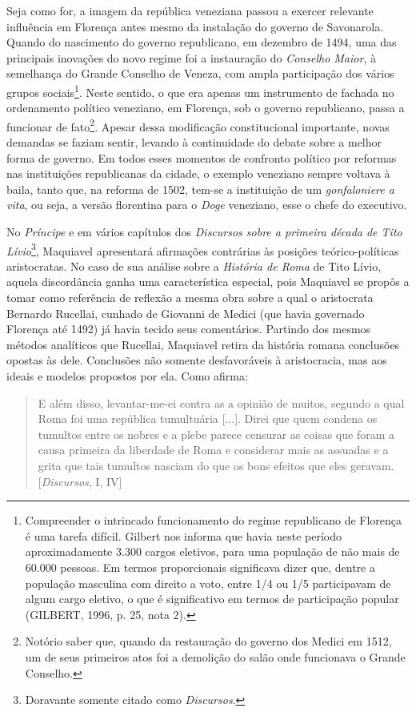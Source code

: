Seja como for, a imagem da república veneziana passou a exercer
relevante influência em Florença antes mesmo da instalação do governo de
Savonarola. Quando do nascimento do governo republicano, em dezembro de
1494, uma das principais inovações do novo regime foi a instauração do
\emph{Conselho Maior}, à semelhança do Grande Conselho de Veneza, com
ampla participação dos vários grupos sociais\footnote{Compreender o
  intrincado funcionamento do regime republicano de Florença é uma
  tarefa difícil. Gilbert nos informa que havia neste período
  aproximadamente 3.300 cargos eletivos, para uma população de não mais
  de 60.000 pessoas. Em termos proporcionais significava dizer que,
  dentre a população masculina com direito a voto, entre 1/4 ou 1/5
  participavam de algum cargo eletivo, o que é significativo em termos
  de participação popular (GILBERT, 1996, p. 25, nota 2).}. Neste
sentido, o que era apenas um instrumento de fachada no ordenamento
político veneziano, em Florença, sob o governo republicano, passa a
funcionar de fato\footnote{Notório saber que, quando da restauração do
  governo dos Medici em 1512, um de seus primeiros atos foi a demolição
  do salão onde funcionava o Grande Conselho.}. Apesar dessa modificação
constitucional importante, novas demandas se faziam sentir, levando à
continuidade do debate sobre a melhor forma de governo. Em todos esses
momentos de confronto político por reformas nas instituições
republicanas da cidade, o exemplo veneziano sempre voltava à baila,
tanto que, na reforma de 1502, tem-se a instituição de um
\emph{gonfaloniere a vita}, ou seja, a versão florentina para o
\emph{Doge} veneziano, esse o chefe do executivo.

No \emph{Príncipe} e em vários capítulos dos \emph{Discursos sobre a
primeira década de Tito Lívio}\footnote{Doravante somente citado como
  \emph{Discursos}.}, Maquiavel apresentará afirmações contrárias às
posições teórico-políticas aristocratas. No caso de sua análise sobre a
\emph{História de Roma} de Tito Lívio, aquela discordância ganha uma
característica especial, pois Maquiavel se propôs a tomar como
referência de reflexão a mesma obra sobre a qual o aristocrata Bernardo
Rucellai, cunhado de Giovanni de Medici (que havia governado Florença
até 1492) já havia tecido seus comentários. Partindo dos mesmos métodos
analíticos que Rucellai, Maquiavel retira da história romana conclusões
opostas às dele. Conclusões não somente desfavoráveis à aristocracia,
mas aos ideais e modelos propostos por ela. Como afirma:

\begin{quote}
E além disso, levantar-me-ei contra as a opinião de muitos, segundo a
qual Roma foi uma república tumultuária {[}...{]}. Direi que quem
condena os tumultos entre os nobres e a plebe parece censurar as coisas
que foram a causa primeira da liberdade de Roma e considerar mais as
assuadas e a grita que tais tumultos nasciam do que os bons efeitos que
eles geravam. {[}\emph{Discursos}, I, IV{]}
\end{quote}

